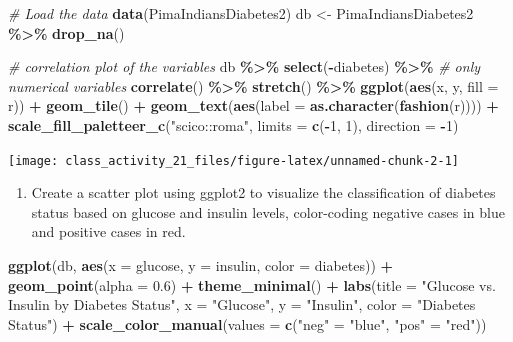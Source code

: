 \documentclass[
]{book}
\newenvironment{Shaded}{\begin{snugshade}}{\end{snugshade}}
\newcommand{\AttributeTok}[1]{\textcolor[rgb]{0.13,0.29,0.53}{#1}}
\newcommand{\CommentTok}[1]{\textcolor[rgb]{0.56,0.35,0.01}{\textit{#1}}}
\newcommand{\DecValTok}[1]{\textcolor[rgb]{0.00,0.00,0.81}{#1}}
\newcommand{\FloatTok}[1]{\textcolor[rgb]{0.00,0.00,0.81}{#1}}
\newcommand{\FunctionTok}[1]{\textcolor[rgb]{0.13,0.29,0.53}{\textbf{#1}}}
\newcommand{\NormalTok}[1]{#1}
\newcommand{\OtherTok}[1]{\textcolor[rgb]{0.56,0.35,0.01}{#1}}
\newcommand{\SpecialCharTok}[1]{\textcolor[rgb]{0.81,0.36,0.00}{\textbf{#1}}}
\newcommand{\StringTok}[1]{\textcolor[rgb]{0.31,0.60,0.02}{#1}}
\providecommand{\tightlist}{%
  \setlength{\itemsep}{0pt}\setlength{\parskip}{0pt}}
\begin{document}
\begin{Shaded}
\begin{Highlighting}[]
\CommentTok{\# Load the data}
\FunctionTok{data}\NormalTok{(PimaIndiansDiabetes2)}
\NormalTok{db }\OtherTok{\textless{}{-}}\NormalTok{ PimaIndiansDiabetes2 }\SpecialCharTok{\%\textgreater{}\%} \FunctionTok{drop\_na}\NormalTok{()}

\CommentTok{\# correlation plot of the variables}
\NormalTok{db }\SpecialCharTok{\%\textgreater{}\%}
  \FunctionTok{select}\NormalTok{(}\SpecialCharTok{{-}}\NormalTok{diabetes) }\SpecialCharTok{\%\textgreater{}\%}  \CommentTok{\# only numerical variables}
  \FunctionTok{correlate}\NormalTok{() }\SpecialCharTok{\%\textgreater{}\%}
  \FunctionTok{stretch}\NormalTok{() }\SpecialCharTok{\%\textgreater{}\%}
  \FunctionTok{ggplot}\NormalTok{(}\FunctionTok{aes}\NormalTok{(x, y, }\AttributeTok{fill =}\NormalTok{ r)) }\SpecialCharTok{+}
  \FunctionTok{geom\_tile}\NormalTok{() }\SpecialCharTok{+}
  \FunctionTok{geom\_text}\NormalTok{(}\FunctionTok{aes}\NormalTok{(}\AttributeTok{label =} \FunctionTok{as.character}\NormalTok{(}\FunctionTok{fashion}\NormalTok{(r)))) }\SpecialCharTok{+}
  \FunctionTok{scale\_fill\_paletteer\_c}\NormalTok{(}\StringTok{"scico::roma"}\NormalTok{, }\AttributeTok{limits =} \FunctionTok{c}\NormalTok{(}\SpecialCharTok{{-}}\DecValTok{1}\NormalTok{, }\DecValTok{1}\NormalTok{), }\AttributeTok{direction =} \SpecialCharTok{{-}}\DecValTok{1}\NormalTok{)}
\end{Highlighting}
\end{Shaded}

\texttt{[image: class\_activity\_21\_files/figure-latex/unnamed-chunk-2-1]}

\begin{enumerate}
\def\labelenumi{\alph{enumi}.}
\tightlist
\item
  Create a scatter plot using ggplot2 to visualize the classification of diabetes status based on glucose and insulin levels, color-coding negative cases in blue and positive cases in red.
\end{enumerate}

\begin{Shaded}
\begin{Highlighting}[]
\FunctionTok{ggplot}\NormalTok{(db, }\FunctionTok{aes}\NormalTok{(}\AttributeTok{x =}\NormalTok{ glucose, }\AttributeTok{y =}\NormalTok{ insulin, }\AttributeTok{color =}\NormalTok{ diabetes)) }\SpecialCharTok{+}
  \FunctionTok{geom\_point}\NormalTok{(}\AttributeTok{alpha =} \FloatTok{0.6}\NormalTok{) }\SpecialCharTok{+}
  \FunctionTok{theme\_minimal}\NormalTok{() }\SpecialCharTok{+} 
  \FunctionTok{labs}\NormalTok{(}\AttributeTok{title =} \StringTok{"Glucose vs. Insulin by Diabetes Status"}\NormalTok{,}
       \AttributeTok{x =} \StringTok{"Glucose"}\NormalTok{,}
       \AttributeTok{y =} \StringTok{"Insulin"}\NormalTok{,}
       \AttributeTok{color =} \StringTok{"Diabetes Status"}\NormalTok{) }\SpecialCharTok{+} 
  \FunctionTok{scale\_color\_manual}\NormalTok{(}\AttributeTok{values =} \FunctionTok{c}\NormalTok{(}\StringTok{"neg"} \OtherTok{=} \StringTok{"blue"}\NormalTok{, }\StringTok{"pos"} \OtherTok{=} \StringTok{"red"}\NormalTok{))}
\end{Highlighting}
\end{Shaded}
\end{document}
